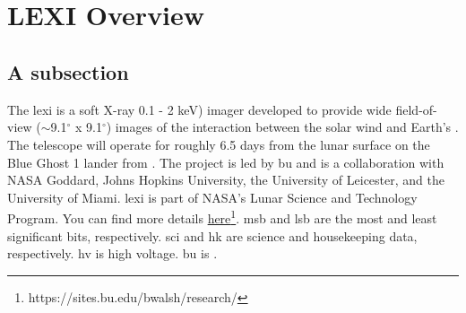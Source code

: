 \documentclass[12pt]{article}
\newcommand\npnpn[1]{\clearpage\thispagestyle{empty}\addtocounter{page}{-1} \ \clearpage}
\begin{document}
    
    \nopagecolor%

    \tableofcontents
    \npnpn

    \listoffigures

    \listoftables
    \npnpn

    \glossarystyle{altlist}
    \printglossary[type=\acronymtype, title=Glossary of Abbreviations, toctitle=Glossary]

    
    \section[LEXI Overview]{LEXI Overview}
        \subsection[Short tile 1]{A subsection}
            The \gls{lexi} \citep{Kuntz2022} is a soft X-ray 0.1 - 2 keV) imager developed to
            provide wide field-of-view ($\sim$9.1$^{\circ}$ x 9.1$^{\circ}$) images of the
            interaction between the solar wind and Earth’s . The telescope will
            operate for roughly 6.5 days from the lunar surface on the Blue Ghost 1 lander from 
            . The project is led by \gls{bu} and is a collaboration with NASA 
            Goddard, Johns Hopkins University, the University of Leicester, and the University of
            Miami. \gls{lexi} is part of NASA’s Lunar Science and Technology Program. You
            can find more details \href{https://sites.bu.edu/bwalsh/research/}{here}\footnote[1]
            {https://sites.bu.edu/bwalsh/research/}. \gls{msb} and \gls{lsb} are the most and least
            significant bits, respectively. \gls{sci} and \gls{hk} are science and housekeeping
            data, respectively. \gls{hv} is high voltage. \gls{bu} is  
            .
\end{document}
